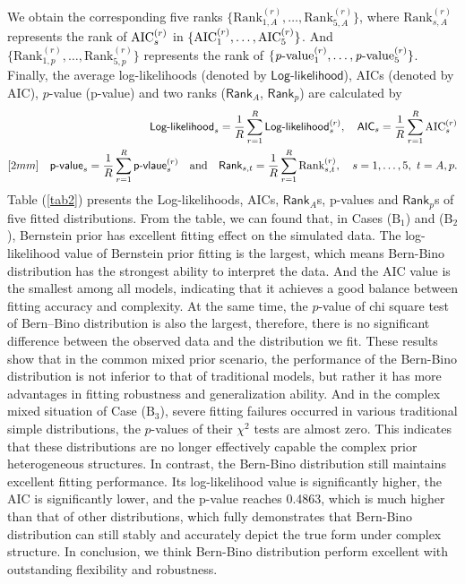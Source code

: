 We obtain the corresponding five ranks $\{\mbox{Rank}_{1,A}^{(r)}, \ldots, \mbox{Rank}_{5,A}^{(r)}\}$, where $\mbox{Rank}_{s,A}^{(r)}$ represents the rank of $\mbox{AIC}_s^{(r)}$ in $\{\mbox{AIC}_1^{(r)},\dots,\mbox{AIC}_5^{(r)}\}$. And $\{\mbox{Rank}_{1,p}^{(r)}, \ldots, \mbox{Rank}_{5,p}^{(r)}\}$ represents the rank of $\{\mbox{\textit{p}-value}_1^{(r)}, \dots, \mbox{\textit{p}-value}_5^{(r)}\}$. Finally, the average log-likelihoods (denoted by $\textsf{Log-likelihood}$), AICs (denoted by \textsf{AIC}), $p$-value (\textsf{p-value}) and two ranks ($\textsf{Rank}_A$, $\textsf{Rank}_p$) are calculated by
\begin{eqnarray}
    &&\textsf{Log-likelihood}_s = \frac{1}{R}\sum_{r=1}^{R} \textsf{Log-likelihood}_s^{(r)}, \quad \textsf{AIC}_s = \frac{1}{R}\sum_{r=1}^{R} \mbox{AIC}_s^{(r)} \nonumber \\ [2mm]
    &&\textsf{p-value}_s = \frac{1}{R}\sum_{r=1}^{R} \textsf{p-vlaue}_s^{(r)} \quad \mbox{and} \quad \textsf{Rank}_{s,t} = \frac{1}{R}\sum_{r=1}^{R}\mbox{Rank}_{s,t}^{(r)},\quad s=1,\dots,5, \ t = A,p. \nonumber
\end{eqnarray}
Table (\ref{tab2}) presents the \textsf{Log-likelihood}s, \textsf{AIC}s, $\textsf{Rank}_A$s, \textsf{p-value}s and $\textsf{Rank}_p$s of five fitted distributions. From the table, we can found that, in Cases ($\mbox{B}_1$) and ($\mbox{B}_2$), Bernstein prior has excellent fitting effect on the simulated data. The log-likelihood value of Bernstein prior fitting is the largest, which means Bern-Bino distribution has the strongest ability to interpret the data. And the AIC value is the smallest among all models, indicating that it achieves a good balance between fitting accuracy and complexity. At the same time, the $p$-value of chi square test of Bern--Bino distribution is also the largest, therefore, there is no significant difference between the observed data and the distribution we fit. These results show that in the common mixed prior scenario, the performance of the Bern-Bino distribution is not inferior to that of traditional models, but rather it has more advantages in fitting robustness and generalization ability. And in the complex mixed situation of Case ($\mbox{B}_3$), severe fitting failures occurred in various traditional simple distributions, the $p$-values of their $\chi^2$ tests are almost zero. This indicates that these distributions are no longer effectively capable the complex prior heterogeneous structures. In contrast, the Bern-Bino distribution still maintains excellent fitting performance. Its log-likelihood value is significantly higher, the AIC is significantly lower, and the p-value reaches 0.4863, which is much higher than that of other distributions, which fully demonstrates that Bern-Bino distribution can still stably and accurately depict the true form under complex structure. In conclusion, we think Bern-Bino distribution perform excellent with outstanding flexibility and robustness.

